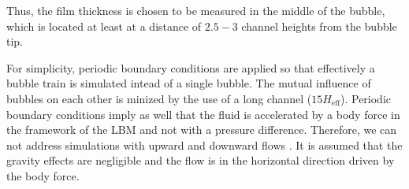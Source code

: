 \documentclass{article}
\begin{document}
Thus, the
film thickness is chosen to be measured in the
middle of the bubble, which is located at least at a distance of $2.5-3$ channel heights from the 
bubble tip.%

For simplicity, periodic boundary conditions are applied so that effectively a bubble train is simulated
intead of a single bubble.  The mutual influence of bubbles on each other is minized by the use of a long
channel ($15 H_{\mathrm{eff}}$). Periodic boundary conditions imply as well that the fluid is accelerated by a
body force in the framework of the LBM and not with a pressure difference. Therefore, we can not
address simulations with upward and downward flows \cite{cerro-bubble-train}. It is assumed that
the gravity effects are negligible and the flow is in the horizontal direction driven by the body
force. 
\end{document}
